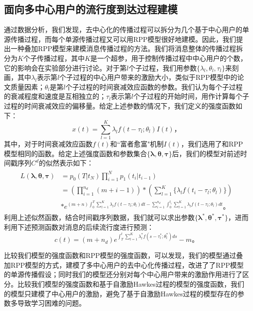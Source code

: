\subsection{面向多中心用户的流行度到达过程建模}
通过数据分析，我们发现，去中心化的传播过程可以拆分为几个基于中心用户的单源传播过程，而每个单源传播过程又可以用RPP模型很好地建模。因此，我们提出一种叠加RPP模型来建模消息传播过程的方法。我们将消息整体的传播过程拆分为$K$个子传播过程，其中$K$是一个超参，用于控制传播过程中中心用户的个数，它的影响会在实验部分进行讨论。对于第$l$个子过程，我们用参数$\{\lambda_l,\theta_l,\tau_l\}$来刻画，其中$\lambda_l$表示第$l$个子过程的中心用户带来的激励大小，类似于RPP模型中的论文质量因素；$\theta_l$是第$l$个子过程的时间衰减效应函数的参数。我们认为每个子过程的衰减程度和速度是互相独立的；$\tau_l$表示第$l$个子过程的开始时间，用作计算每个子过程的时间衰减效应的偏移量。给定上述参数的情况下，我们定义的强度函数如下：
\begin{equation}
x(t)=\sum_{l=1}^{K}\lambda_l f(t-\tau_l;\theta_l)I(t)\text{，}
\end{equation}
其中，对于时间衰减效应函数$f(t)$和``富者愈富"机制$I(t)$，我们选用了和RPP模型相同的函数。给定上述强度函数和参数集合$\{\pmb{\lambda},\pmb{\theta},\pmb{\tau}\}$后，我们的模型对前述时间戳序列$C^d$的似然表示如下：
\begin{eqnarray}
\label{eq:mixrppLikelihood}
\begin{split}
L(\pmb{\lambda},\pmb{\theta},\pmb{\tau}) & =p_0(T|t_N)\prod_{i=1}^{N}p_1(t_i|t_{i-1}) \\
& = (\prod_{i=1}^{n_d}(m+i-1))\ast (\sum_{l=1}^{K}\{\lambda_l f(t_i-\tau_l;\theta_l)\}) \\
& \ast e^{(m+n)\int_{0}^{T}\sum_{l=1}^{K}\lambda_l f(t-\tau_l;\theta_l)dt-\sum_{i=1}^{n_d}\int_{0}^{t_i}\sum_{l=1}^{K}\lambda_l f(t-\tau_l;\theta_l)dt}\text{。}
\end{split}
\end{eqnarray}
利用上述似然函数，结合时间戳序列数据，我们就可以求出参数$\{\pmb{\lambda^{\ast}},\pmb{\theta^{\ast}},\pmb{\tau^{\ast}}\}$，进而利用下述预测函数对消息的后续流行度进行预测：
\begin{equation}
c(t)=(m+n_d)e^{\int_{T}^{t}\sum_{l=1}^{K}\lambda_l^{\ast}f(s-\tau_l^{\ast};\theta_l^{\ast})ds}-m\text{。}
\end{equation}

比较我们模型的强度函数和RPP模型的强度函数，可以发现，我们的模型通过叠加RPP模型的方式，建模了多中心用户的去中心化传播过程，改进了了RPP模型的单源传播假设；同时我们的模型还分别对每个中心用户带来的激励作用进行了区分。比较我们模型的强度函数和基于自激励Hawkes过程的模型的强度函数，我们的模型只建模了中心用户的激励，避免了基于自激励Hawkes过程的模型存在的参数多导致学习困难的问题。

